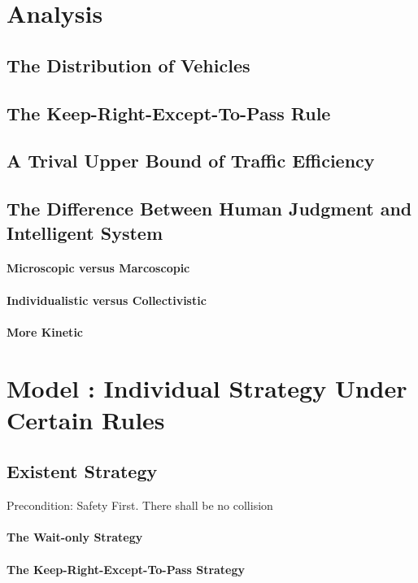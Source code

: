 \section{Analysis}
\subsection{The Distribution of Vehicles}

\subsection{The Keep-Right-Except-To-Pass Rule}

\subsection{A Trival Upper Bound of Traffic Efficiency}

\subsection{The Difference Between Human Judgment and Intelligent System}
\paragraph{Microscopic versus Marcoscopic}
\paragraph{Individualistic versus Collectivistic}
\paragraph{More Kinetic}

\section{Model \uppercase\expandafter{}: Individual Strategy Under Certain Rules}
\subsection{Existent Strategy}
Precondition: Safety First. There shall be no collision
\paragraph{The Wait-only Strategy}
\paragraph{The Keep-Right-Except-To-Pass Strategy}
